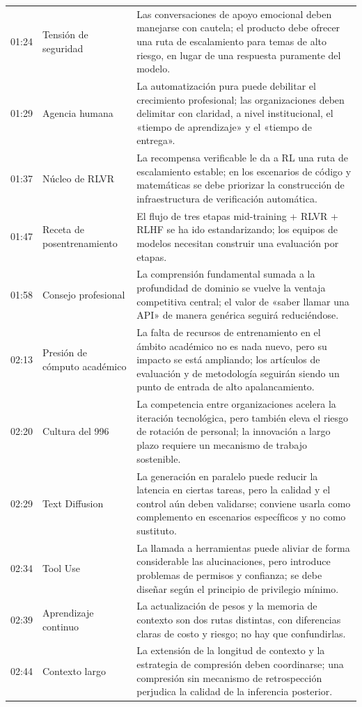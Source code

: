 \begin{longtable}{p{}p{}p{}}
01:24 & Tensión de seguridad & Las conversaciones de apoyo emocional deben manejarse con cautela; el producto debe ofrecer una ruta de escalamiento para temas de alto riesgo, en lugar de una respuesta puramente del modelo. \\
01:29 & Agencia humana & La automatización pura puede debilitar el crecimiento profesional; las organizaciones deben delimitar con claridad, a nivel institucional, el «tiempo de aprendizaje» y el «tiempo de entrega». \\
01:37 & Núcleo de RLVR & La recompensa verificable le da a RL una ruta de escalamiento estable; en los escenarios de código y matemáticas se debe priorizar la construcción de infraestructura de verificación automática. \\
01:47 & Receta de posentrenamiento & El flujo de tres etapas mid-training + RLVR + RLHF se ha ido estandarizando; los equipos de modelos necesitan construir una evaluación por etapas. \\
01:58 & Consejo profesional & La comprensión fundamental sumada a la profundidad de dominio se vuelve la ventaja competitiva central; el valor de «saber llamar una API» de manera genérica seguirá reduciéndose. \\
02:13 & Presión de cómputo académico & La falta de recursos de entrenamiento en el ámbito académico no es nada nuevo, pero su impacto se está ampliando; los artículos de evaluación y de metodología seguirán siendo un punto de entrada de alto apalancamiento. \\
02:20 & Cultura del 996 & La competencia entre organizaciones acelera la iteración tecnológica, pero también eleva el riesgo de rotación de personal; la innovación a largo plazo requiere un mecanismo de trabajo sostenible. \\
02:29 & Text Diffusion & La generación en paralelo puede reducir la latencia en ciertas tareas, pero la calidad y el control aún deben validarse; conviene usarla como complemento en escenarios específicos y no como sustituto. \\
02:34 & Tool Use & La llamada a herramientas puede aliviar de forma considerable las alucinaciones, pero introduce problemas de permisos y confianza; se debe diseñar según el principio de privilegio mínimo. \\
02:39 & Aprendizaje continuo & La actualización de pesos y la memoria de contexto son dos rutas distintas, con diferencias claras de costo y riesgo; no hay que confundirlas. \\
02:44 & Contexto largo & La extensión de la longitud de contexto y la estrategia de compresión deben coordinarse; una compresión sin mecanismo de retrospección perjudica la calidad de la inferencia posterior. \\

\end{longtable}

